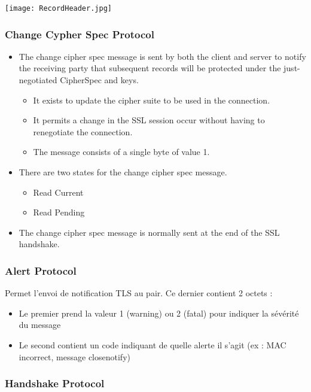 \documentclass{report}
\begin{document}
 \texttt{[image: RecordHeader.jpg]}

 \subsubsection{Change Cypher Spec Protocol}

 \begin{itemize}
    \item The change cipher spec message is sent by both the client and server to notify the receiving party that subsequent records will be protected under the just-negotiated CipherSpec and keys.
    \begin{itemize}
        \item It exists to update the cipher suite to be used in the connection.
        \item It permits a change in the SSL session occur without having to renegotiate the connection.
        \item The message consists of a single byte of value 1.
    \end{itemize}
    \item There are two states for the change cipher spec message.
    \begin{itemize}
        \item Read Current
        \item Read Pending
    \end{itemize}
    \item The change cipher spec message is normally sent at the end of the SSL handshake.
 \end{itemize}

 \subsubsection{Alert Protocol}

 Permet l'envoi de notification TLS au pair. Ce dernier contient 2 octets :
 \begin{itemize}
    \item Le premier prend la valeur 1 (warning) ou 2 (fatal) pour indiquer la sévérité du message
    \item Le second contient un code indiquant de quelle alerte il s’agit (ex : MAC incorrect, message closenotify)
 \end{itemize}

\subsubsection{Handshake Protocol}
\end{document}
